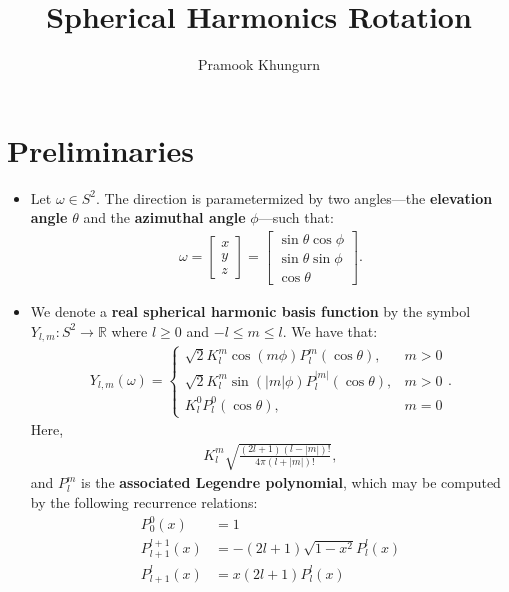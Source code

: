 \documentclass[10pt]{article}
\title{Spherical Harmonics Rotation}
\author{Pramook Khungurn}
\newcommand{\ra}{\rightarrow}
\newcommand{\Real}{\mathbb{R}}
\begin{document}
	\maketitle

    \section{Preliminaries}

    \begin{itemize}
        \item Let $\omega \in S^2$.  The direction is parametermized by two angles---the \textbf{elevation angle} $\theta$ and the \textbf{azimuthal angle} $\phi$---such that:
        \begin{align*}
            \omega
            = \begin{bmatrix}
                x \\ y \\ z
            \end{bmatrix}
            = \begin{bmatrix}
                \sin\theta \cos\phi \\
                \sin\theta \sin\phi \\
                \cos\theta
            \end{bmatrix}.
        \end{align*}

        \item We denote a \textbf{real spherical harmonic basis function} by the symbol $Y_{l,m}: S^2 \ra \Real$ where $l \geq 0$ and $-l \leq m \leq l$.  We have that:
        \begin{align*}
            Y_{l,m}(\omega)
            = \begin{cases}
                \sqrt{2} K_l^m \cos (m\phi) P_l^m (\cos\theta), & m > 0 \\
                \sqrt{2} K_l^m \sin (|m|\phi) P_l^{|m|} (\cos\theta), & m > 0 \\
                K_l^0 P_l^0 (\cos\theta), & m = 0
            \end{cases}.
        \end{align*}
        Here,
        \begin{align*}
            K_l^m \sqrt{\frac{(2l+1)(l-|m|)!}{4\pi(l+|m|)!}},
        \end{align*}
        and $P_l^m$ is the \textbf{associated Legendre polynomial}, which may be computed by the following recurrence relations:
        \begin{align*}            
            P_0^0(x) &= 1 \\
            P^{l+1}_{l+1}(x) &= -(2l+1) \sqrt{1 - x^2} P^l_l(x) \\
            P^l_{l+1}(x) &= x(2l+1)P^l_l(x)
        \end{align*}


\end{itemize}
\end{document}

